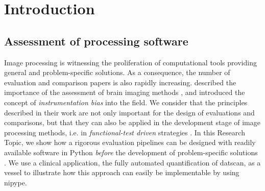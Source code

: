 \documentclass{frontiers}
\newcommand{\fixme}[1]{}
\newcommand{\fixme}[1]{{\color{red}{\bf FIXME: }\emph{#1}}}
\begin{document}

\glsresetall[\acronymtype]

\section{Introduction}\label{sec:intro}

\subsection{Assessment of processing software}
\label{sec:intro_software}
Image processing is witnessing the proliferation of computational tools
  providing general and problem-specific solutions.
As a consequence, the number of evaluation and comparison papers is
  also rapidly increasing.
\cite{tustison_instrumentation_2013} described
  the importance of the assessment of brain imaging methods \fixme{assessment in what aspect?}, and 
  introduced the concept of \emph{instrumentation bias} into the field.
We consider that the principles described in their work are not only
  important for the design of evaluations and comparisons, 
  but that they can  also be applied in the development stage of image processing
  methods, i.e. in \emph{functional-test driven} strategies \fixme{add a reference to FTD}.
In this Research Topic, we show how a rigorous  evaluation pipelines can be designed
  with readily available software in Python \emph{before} the development of 
  problem-specific solutions .
We use a clinical application, the fully automated quantification of \gls*{datscan},
  as a vessel to illustrate how this approach can easily be implementable by using \gls*{nipype}.
\end{document}
